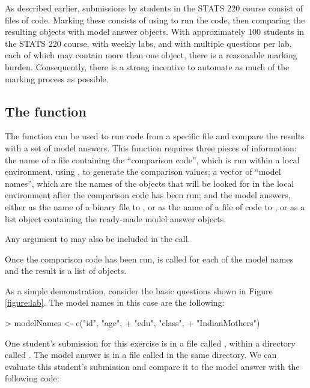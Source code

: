 As described earlier, submissions by students in the STATS 220 course consist
of files of \R{} code.  Marking these consists of using 
 to run the code, then comparing the resulting objects
with model answer objects.
With approximately 100 students
in the STATS 220 course, with weekly labs, and with multiple questions per lab,
each of which may contain more than one \R{} object, there is 
a reasonable marking burden.
Consequently, there is a strong incentive to automate
as much
of the marking process as possible.  

\subsection*{The  function}

The  function can be used to run \R{} code from a 
specific file and compare the results with a set of model answers.
This function
requires three pieces of 
information:  the name of a file containing the ``comparison code'', 
which is run
within a local environment,
using , to generate the comparison values; 
a vector of ``model names'', which are the names of the objects that will 
be looked for in the local environment after the comparison code has been run;
and the model answers, either as the name of a binary file to 
, or as the name of a file of \R{} code to 
, or as a list object containing the ready-made
model answer objects.

Any argument to  may also be included in the call.

Once the comparison code has been run, 
 is called for each of the model names and the result
is a list of 
 objects.

As a simple demonstration, consider
the basic questions shown in Figure \ref{figure:lab}.
The model names in this case are the following:

\begin{Schunk}
\begin{Sinput}
> modelNames <- c("id", "age", 
+                 "edu", "class", 
+                 "IndianMothers")
\end{Sinput}
\end{Schunk}
One student's submission for this exercise is in a file called 
, within a directory called .  
The model answer is in a file called 
in the same directory.
We can evaluate this student's submission and compare it to the
model answer with the following code:

